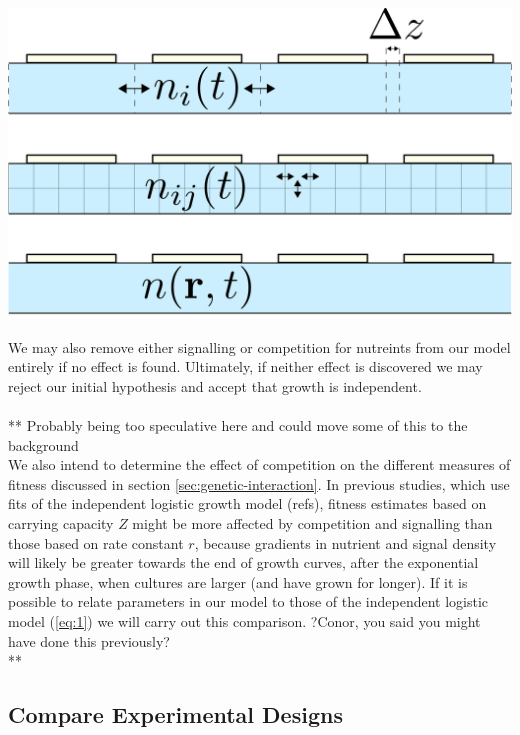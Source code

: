 \begin{Figure}
  \centering
  \includegraphics[width=\linewidth]{height_dep_miniqfa_delta_z}
  \label{fig:height_dependence}
\end{Figure}

We may also remove either signalling or competition for nutreints from
our model entirely if no effect is found. Ultimately, if neither effect
is discovered we may reject our initial hypothesis and accept that
growth is independent.
\\\\
** Probably being too speculative here and could move some of this to
the background
\\
We also intend to determine the effect of competition on the different
measures of fitness discussed in section
\ref{sec:genetic-interaction}. In previous studies, which use fits of
the independent logistic growth model (refs), fitness estimates based
on carrying capacity \(Z\) might be more affected by competition and
signalling than those based on rate constant \(r\), because gradients
in nutrient and signal density will likely be greater towards the end
of growth curves, after the exponential growth phase, when cultures
are larger (and have grown for longer). If it is possible to relate
parameters in our model to those of the independent logistic model
(\ref{eq:1}) we will carry out this comparison. ?Conor, you said you
might have done this previously?
\\
**


\subsection{Compare Experimental Designs}
\label{sec:comp-exper-designs}

